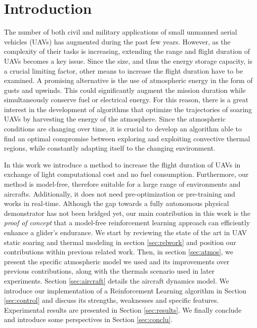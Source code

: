 \documentclass{ifacconf}
\begin{document}
\section{Introduction}

The number of both civil and military applications of small unmanned aerial vehicles (UAVs) has augmented during the past few years. However, as the complexity of their tasks is increasing, extending the range and flight duration of UAVs becomes a key issue. Since the size, and thus the energy storage capacity, is a crucial limiting factor, other means to increase the flight duration have to be examined. A promising alternative is the use of atmospheric energy in the form of gusts and upwinds. This could significantly augment the mission duration while simultaneously conserve fuel or electrical energy. For this reason, there is a great interest in the development of algorithms that optimize the trajectories of soaring UAVs by harvesting the energy of the atmosphere. Since the atmospheric conditions are changing over time, it is crucial to develop an algorithm able to find an optimal compromise between exploring and exploiting convective thermal regions, while constantly adapting itself to the changing environment.

In this work we introduce a method to increase the flight duration of UAVs in exchange of light computational cost and no fuel consumption. Furthermore, our method is model-free, therefore suitable for a large range of environments and aircrafts. Additionally, it does not need pre-optimization or pre-training and works in real-time. Although the gap towards a fully autonomous physical demonstrator has not been bridged yet, our main contribution in this work is the \emph{proof of concept} that a model-free reinforcement learning approach can efficiently enhance a glider's endurance. We start by reviewing the state of the art in UAV static soaring and thermal modeling in section \ref{sec:relwork} and position our contributions within previous related work. Then, in section \ref{sec:atmos}, we present the specific atmospheric model we used and its improvements over previous contributions, along with the thermals scenario used in later experiments. Section \ref{sec:aircraft} details the aircraft dynamics model. We introduce our implementation of a Reinforcement Learning algorithm in Section \ref{sec:control} and discuss its strengths, weaknesses and specific features. Experimental results are presented in Section \ref{sec:results}. We finally conclude and introduce some perspectives in Section \ref{sec:conclu}.
\end{document}
